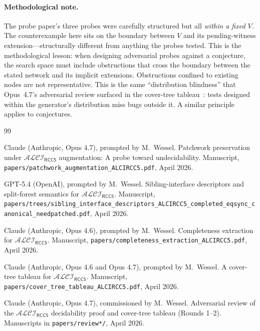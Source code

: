 \documentclass[11pt]{article}
\theoremstyle{definition}
\theoremstyle{remark}
\newcommand{\ALCIRCC}[1]{\mathcal{ALCI}_{\mathsf{RCC#1}}}
\begin{document}
\paragraph{Methodological note.}  The probe paper's three probes were
carefully structured but all \emph{within a fixed $V$}.  The
counterexample here sits on the boundary between $V$ and its
pending-witness extension---structurally different from anything the
probes tested.  This is the methodological lesson: when designing
adversarial probes against a conjecture, the search space must
include obstructions that cross the boundary between the stated
network and its implicit extensions.  Obstructions confined to
existing nodes are not representative.  This is the same
``distribution blindness'' that Opus~4.7's adversarial review
surfaced in the cover-tree tableau~\cite{Round2Review}: tests
designed within the generator's distribution miss bugs outside it.
A similar principle applies to conjectures.

\begin{thebibliography}{99}

Claude (Anthropic, Opus 4.7), prompted by M.~Wessel.
\newblock Patchwork preservation under $\ALCIRCC{5}$ augmentation: A
  probe toward undecidability.
\newblock Manuscript, \texttt{papers/patchwork\_augmentation\_ALCIRCC5.pdf},
  April 2026.

GPT-5.4 (OpenAI), prompted by M.~Wessel.
\newblock Sibling-interface descriptors and split-forest semantics for
  $\ALCIRCC{5}$.
\newblock Manuscript,
  \texttt{papers/trees/sibling\_interface\_descriptors\_ALCIRCC5\_completed\_eqsync\_canonical\_needpatched.pdf},
  April 2026.

Claude (Anthropic, Opus 4.6), prompted by M.~Wessel.
\newblock Completeness extraction for $\ALCIRCC{5}$.
\newblock Manuscript,
  \texttt{papers/completeness\_extraction\_ALCIRCC5.pdf}, April 2026.

Claude (Anthropic, Opus 4.6 and Opus 4.7), prompted by M.~Wessel.
\newblock A cover-tree tableau for $\ALCIRCC{5}$.
\newblock Manuscript,
  \texttt{papers/cover\_tree\_tableau\_ALCIRCC5.pdf}, April 2026.

Claude (Anthropic, Opus 4.7), commissioned by M.~Wessel.
\newblock Adversarial review of the $\ALCIRCC{5}$ decidability proof
  and cover-tree tableau (Rounds 1--2).
\newblock Manuscripts in \texttt{papers/review*/}, April 2026.

\end{thebibliography}
\end{document}
